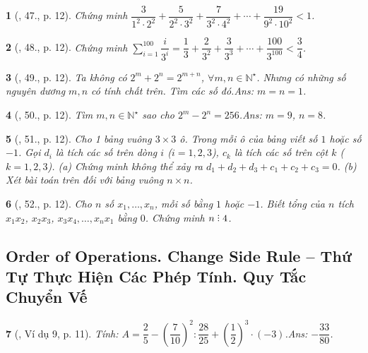 \documentclass{article}
\newtheorem{baitoan}{}
\DeclareRobustCommand{\divby}{%
	\mathrel{\vbox{\baselineskip.65ex\lineskiplimit0pt\hbox{.}\hbox{.}\hbox{.}}}%
}
\begin{document}
\begin{baitoan}[\cite{Binh_Toan_7_tap_1}, 47., p. 12]
	Chứng minh $\dfrac{3}{1^2\cdot 2^2} + \dfrac{5}{2^2\cdot 3^2} + \dfrac{7}{3^2\cdot 4^2} + \cdots + \dfrac{19}{9^2\cdot 10^2} < 1$.
\end{baitoan}

\begin{baitoan}[\cite{Binh_Toan_7_tap_1}, 48., p. 12]
	Chứng minh $\sum_{i=1}^{100} \dfrac{i}{3^i} = \dfrac{1}{3} + \dfrac{2}{3^2} + \dfrac{3}{3^3} + \cdots + \dfrac{100}{3^{100}} < \dfrac{3}{4}$.
\end{baitoan}

\begin{baitoan}[\cite{Binh_Toan_7_tap_1}, 49., p. 12]
	Ta không có $2^m + 2^n = 2^{m+n}$, $\forall m,n\in\mathbb{N}^\star$. Nhưng có những số nguyên dương $m,n$ có tính chất trên. Tìm các số đó.\hfill{\sf Ans: $m = n = 1$.}
\end{baitoan}

\begin{baitoan}[\cite{Binh_Toan_7_tap_1}, 50., p. 12]
	Tìm $m,n\in\mathbb{N}^\star$ sao cho $2^m - 2^n = 256$.\hfill{\sf Ans: $m = 9$, $n = 8$.}
\end{baitoan}

\begin{baitoan}[\cite{Binh_Toan_7_tap_1}, 51., p. 12]
	Cho 1 bảng vuông $3\times 3$ ô. Trong mỗi ô của bảng viết số $1$ hoặc số $-1$. Gọi $d_i$ là tích các số trên dòng $i$ ($i = 1,2,3$), $c_k$ là tích các số trên cột $k$ ($k = 1,2,3$). (a) Chứng minh không thể xảy ra $d_1 + d_2 + d_3 + c_1 + c_2 + c_3 = 0$. (b) Xét bài toán trên đối với bảng vuông $n\times n$.	
\end{baitoan}

\begin{baitoan}[\cite{Binh_Toan_7_tap_1}, 52., p. 12]
	Cho $n$ số $x_1,\ldots,x_n$, mỗi số bằng $1$ hoặc $-1$. Biết tổng của $n$ tích $x_1x_2$, $x_2x_3$, $x_3x_4,\ldots,x_nx_1$ bằng $0$. Chứng minh $n\divby4$.
\end{baitoan}


\subsection{Order of Operations. Change Side Rule -- Thứ Tự Thực Hiện Các Phép Tính. Quy Tắc Chuyển Vế}

\begin{baitoan}[\cite{Tuyen_Toan_7}, Ví dụ 9, p. 11]
	Tính: $A = \dfrac{2}{5} - \left(\dfrac{7}{10}\right)^2:\dfrac{28}{25} + \left(\dfrac{1}{2}\right)^3\cdot(-3)$.\hfill{\sf Ans: $-\dfrac{33}{80}$.}
\end{baitoan}
\end{document}
